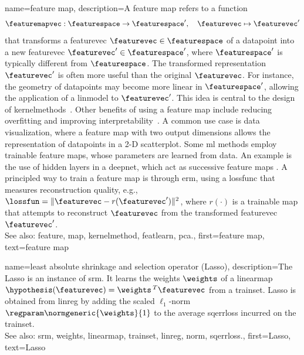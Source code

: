 {name={feature map}, 
	description={A \gls{feature} \gls{map} refers to a \gls{function} 
		$$
		\featuremapvec: \featurespace \rightarrow \featurespace', \quad \featurevec \mapsto \featurevec'
		$$
		that transforms a \gls{featurevec} $\featurevec \in \featurespace$ of 
 		a \gls{datapoint} into a new \gls{featurevec} $\featurevec' \in \featurespace'$, 
 		where $\featurespace'$ is typically different from $\featurespace$.
 		The transformed representation $\featurevec'$ is often more useful than the original 
 		$\featurevec$. For instance, the geometry of \glspl{datapoint} may become more linear 
 		in $\featurespace'$, allowing the application of a \gls{linmodel} to $\featurevec'$. 
 		This idea is central to the design of \glspl{kernelmethod}~\cite{LearningKernelsBook}.
 		Other benefits of using a \gls{feature} \gls{map} include reducing \gls{overfitting} and 
 		improving \gls{interpretability}~\cite{Ribeiro2016}. A common use case is \gls{data} 
 		visualization, where a \gls{feature} \gls{map} with two output dimensions allows the representation 
 		of \glspl{datapoint} in a 2-D \gls{scatterplot}. Some \gls{ml} methods employ trainable 
 		\gls{feature} \glspl{map}, whose \glspl{parameter} are learned from \gls{data}. An example is 
 		the use of hidden \glspl{layer} in a \gls{deepnet}, which act as successive \gls{feature} \glspl{map} 
 		\cite{MallatUnderstandingDeepLearning}. A principled way to train a \gls{feature} \gls{map} 
 		is through \gls{erm}, using a \gls{lossfunc} that measures reconstruction quality, 
 		e.g., $\lossfun = \|\featurevec - r(\featurevec')\|^2$, where $r(\cdot)$ is a trainable
 		\gls{map} that attempts to reconstruct $\featurevec$ from the transformed \gls{featurevec} $\featurevec'$.
				\\
		See also: \gls{feature}, \gls{map}, \gls{kernelmethod}, \gls{featlearn}, \gls{pca}.},
	first={feature map},
	text={feature map} 
}
	
 
 {name={least absolute shrinkage and selection operator (Lasso)}, 
	description={The Lasso is an 
		instance of \gls{srm}. It learns the \gls{weights} $\weights$ of a \gls{linearmap} 
		$\hypothesis(\featurevec) = \weights\,^{T} \featurevec$ from a \gls{trainset}. 
		Lasso is obtained from \gls{linreg} by adding the scaled $\ell_{1}$-\gls{norm} 
		$\regparam \normgeneric{\weights}{1}$ to the average \gls{sqerrloss} incurred on the \gls{trainset}. 
				\\
		See also: \gls{srm}, \gls{weights}, \gls{linearmap}, \gls{trainset}, \gls{linreg}, \gls{norm}, \gls{sqerrloss}.},
	first={Lasso},
	text={Lasso} 
}
 
